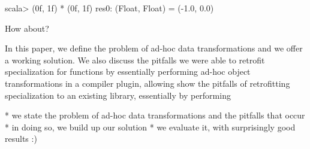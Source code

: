 
\begin{lstlisting-nobreak}
scala> (0f, 1f) * (0f, 1f)
res0: (Float, Float) = (-1.0, 0.0)
\end{lstlisting-nobreak}

How about?




In this paper, we define the problem of ad-hoc data transformations and we offer a working solution. We also discuss the pitfalls we were able to retrofit specialization for functions by essentially performing ad-hoc object transformations in a compiler plugin, allowing show the pitfalls of retrofitting specialization to an existing library, essentially by performing


 * we state the problem of ad-hoc data transformations and the pitfalls that occur
 * in doing so, we build up our solution
 * we evaluate it, with surprisingly good results :)


